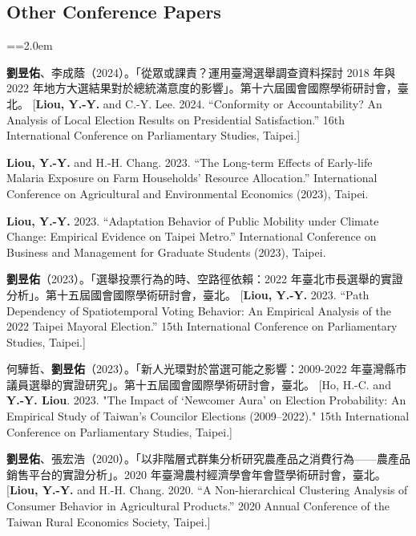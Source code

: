 \documentclass[11pt,letterpaper]{article}
\newenvironment{hanglist}{\par\setlength{\parindent}{0pt}\everypar={\hangindent=2.0em\hangafter=1}}{\par}
\begin{document}
\hypertarget{other-conference-papers}{%
\subsection{Other Conference Papers}\label{other-conference-papers}}

\begin{hanglist}

\textbf{劉昱佑}、李成蔭（2024）。「從眾或課責？運用臺灣選舉調查資料探討 2018 年與 2022 年地方大選結果對於總統滿意度的影響」。第十六屆國會國際學術研討會，臺北。 \newline{} {[}\textbf{Liou, Y.-Y.} and C.-Y. Lee. 2024. ``Conformity or Accountability? An Analysis of Local Election Results on Presidential Satisfaction.'' 16th International Conference on Parliamentary Studies, Taipei.{]}

\textbf{Liou, Y.-Y.} and H.-H. Chang. 2023. ``The Long-term Effects of Early-life Malaria Exposure on Farm Households' Resource Allocation.'' International Conference on Agricultural and Environmental Economics (2023), Taipei.

\textbf{Liou, Y.-Y.} 2023. ``Adaptation Behavior of Public Mobility under Climate Change: Empirical Evidence on Taipei Metro.'' International Conference on Business and Management for Graduate Students (2023), Taipei.

\textbf{劉昱佑}（2023）。「選舉投票行為的時、空路徑依賴：2022 年臺北市長選舉的實證分析」。第十五屆國會國際學術研討會，臺北。 \newline{} {[}\textbf{Liou, Y.-Y.} 2023. ``Path Dependency of Spatiotemporal Voting Behavior: An Empirical Analysis of the 2022 Taipei Mayoral Election.'' 15th International Conference on Parliamentary Studies, Taipei.{]}

何驊哲、\textbf{劉昱佑}（2023）。「新人光環對於當選可能之影響：2009-2022 年臺灣縣市議員選舉的實證研究」。第十五屆國會國際學術研討會，臺北。 \newline{} {[}Ho, H.-C. and \textbf{Y.-Y. Liou}. 2023. "The Impact of `Newcomer Aura' on Election Probability: An Empirical Study of Taiwan's Councilor Elections (2009--2022)." 15th International Conference on Parliamentary Studies, Taipei.{]}

\textbf{劉昱佑}、張宏浩（2020）。「以非階層式群集分析研究農產品之消費行為------農產品銷售平台的實證分析」。2020 年臺灣農村經濟學會年會暨學術研討會，臺北。 \newline{} {[}\textbf{Liou, Y.-Y.} and H.-H. Chang. 2020. ``A Non-hierarchical Clustering Analysis of Consumer Behavior in Agricultural Products.'' 2020 Annual Conference of the Taiwan Rural Economics Society, Taipei.{]}


\end{hanglist}
\end{document}
